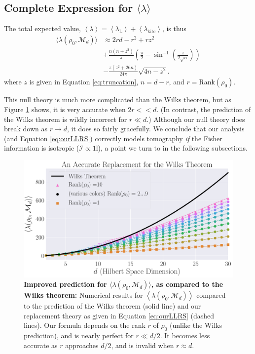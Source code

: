 \documentclass[aps,pra, twocolumn]{revtex4-1}
\newcommand{\M}{\mathcal{M}}
\newcommand{\Id}{\mathbb{I}}
\newcommand{\expect}[1]{\ensuremath{\left\langle#1\right\rangle}}
\def\Id{1\!\mathrm{l}}
\newcommand{\Fi}{\mathcal{I}}
\begin{document}
\subsection{Complete Expression for $\langle \lambda \rangle$}
\label{subsec:LLRS}
The total expected value, $\expect{\lambda} = \expect{\lambda_{\mathrm{L}}} + \expect{\lambda_{\mathrm{kite}}}$, is thus
\begin{align}
\label{eq:ourLLRS}
\nonumber \langle \lambda(\rho_{0}, \M_{d}) \rangle &\approx 2rd - r^{2}+rz^{2}\\
\nonumber & + \frac{n(n+z^{2})}{\pi}\left(\frac{\pi}{2} - \sin^{-1}\left(\frac{z}{2\sqrt{n}}\right)\right) \\
& - \frac{z(z^{2}+26n)}{24\pi}\sqrt{4n-z^{2}}.
\end{align}
where $z$ is given in Equation \eqref{eq:truncation}, $n=d-r$, and $r = \mathrm{Rank}(\rho_{0})$.

This null theory is much more complicated than the Wilks theorem, but as Figure \ref{fig:modelcomp-iso} shows, it is very accurate when $2r << d$. (In contrast, the prediction of the Wilks theorem is wildly incorrect for $r\ll d$.) Although our null theory does break down as $r \rightarrow d$, it does so fairly gracefully. We conclude that our analysis (and Equation \eqref{eq:ourLLRS}) correctly models tomography \emph{if} the Fisher information is isotropic ($\Fi \propto \Id$), a point we turn to in the following subsections.

\begin{figure}
 \includegraphics[width=\columnwidth]{Images/Figure_9.pdf}
 \caption{\textbf{Improved prediction for $\langle \lambda(\rho_{0}, \M_{d})\rangle$, as compared to the Wilks theorem:} Numerical results for $\expect{\lambda(\rho_{0}, \M_{d})}$ compared to the prediction of the Wilks theorem (solid line) and our replacement theory as given in Equation \eqref{eq:ourLLRS} (dashed lines).  Our formula depends on the rank $r$ of $\rho_0$ (unlike the Wilks prediction), and is nearly perfect for $r\ll d/2$.  It becomes less accurate as $r$ approaches $d/2$, and is invalid when $r\approx d$.}
 \label{fig:modelcomp-iso}
\end{figure}
\end{document}
